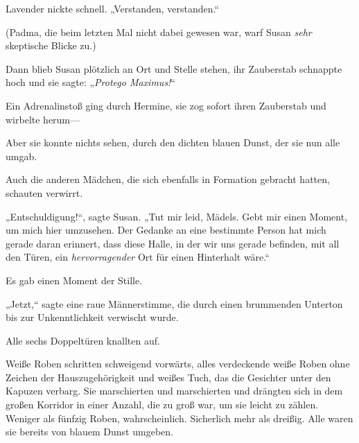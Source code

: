 Lavender nickte schnell. „Verstanden, verstanden.“

(Padma, die beim letzten Mal nicht dabei gewesen war, warf Susan \emph{sehr} skeptische Blicke zu.)

Dann blieb Susan plötzlich an Ort und Stelle stehen, ihr Zauberstab schnappte hoch und sie sagte: „\emph{Protego Maximus!}“

Ein Adrenalinstoß ging durch Hermine, sie zog sofort ihren Zauberstab und wirbelte herum—

Aber sie konnte nichts sehen, durch den dichten blauen Dunst, der sie nun alle umgab.

Auch die anderen Mädchen, die sich ebenfalls in Formation gebracht hatten, schauten verwirrt.

„Entschuldigung!“, sagte Susan. „Tut mir leid, Mädels. Gebt mir einen Moment, um mich hier umzusehen. Der Gedanke an eine bestimmte Person hat mich gerade daran erinnert, dass diese Halle, in der wir uns gerade befinden, mit all den Türen, ein \emph{hervorragender} Ort für einen Hinterhalt wäre.“

Es gab einen Moment der Stille.

„Jetzt,“ sagte eine raue Männerstimme, die durch einen brummenden Unterton bis zur Unkenntlichkeit verwischt wurde.

Alle sechs Doppeltüren knallten auf.

Weiße Roben schritten schweigend vorwärts, alles verdeckende weiße Roben ohne Zeichen der Hauszugehörigkeit und weißes Tuch, das die Gesichter unter den Kapuzen verbarg. Sie marschierten und marschierten und drängten sich in dem großen Korridor in einer Anzahl, die zu groß war, um sie leicht zu zählen. Weniger als fünfzig Roben, wahrscheinlich. Sicherlich mehr als dreißig. Alle waren sie bereits von blauem Dunst umgeben.


